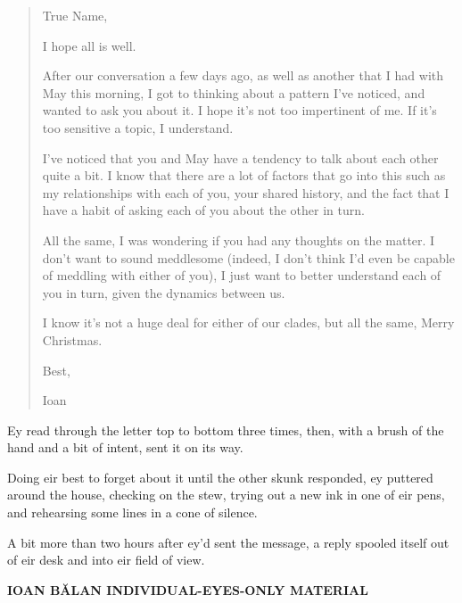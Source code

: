 \begin{quote}
True Name,

I hope all is well.

After our conversation a few days ago, as well as another that I had with May this morning, I got to thinking about a pattern I've noticed, and wanted to ask you about it. I hope it's not too impertinent of me. If it's too sensitive a topic, I understand.

I've noticed that you and May have a tendency to talk about each other quite a bit. I know that there are a lot of factors that go into this such as my relationships with each of you, your shared history, and the fact that I have a habit of asking each of you about the other in turn.

All the same, I was wondering if you had any thoughts on the matter. I don't want to sound meddlesome (indeed, I don't think I'd even be capable of meddling with either of you), I just want to better understand each of you in turn, given the dynamics between us.

I know it's not a huge deal for either of our clades, but all the same, Merry Christmas.

Best,

Ioan
\end{quote}

Ey read through the letter top to bottom three times, then, with a brush of the hand and a bit of intent, sent it on its way.

Doing eir best to forget about it until the other skunk responded, ey puttered around the house, checking on the stew, trying out a new ink in one of eir pens, and rehearsing some lines in a cone of silence.

A bit more than two hours after ey'd sent the message, a reply spooled itself out of eir desk and into eir field of view.

\begin{center}
\textbf{IOAN BĂLAN INDIVIDUAL-EYES-ONLY MATERIAL}
\end{center}

